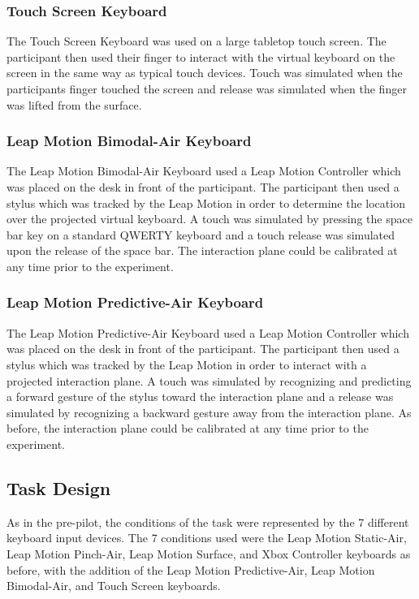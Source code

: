 \subsubsection{Touch Screen Keyboard}
The Touch Screen Keyboard was used on a large tabletop touch screen. The participant then used their finger to interact with the virtual keyboard on the screen in the same way as typical touch devices. Touch was simulated when the participants finger touched the screen and release was simulated when the finger was lifted from the surface.

\subsubsection{Leap Motion Bimodal-Air Keyboard}
The Leap Motion Bimodal-Air Keyboard used a Leap Motion Controller which was placed on the desk in front of the participant. The participant then used a stylus which was tracked by the Leap Motion in order to determine the location over the projected virtual keyboard. A touch was simulated by pressing the space bar key on a standard QWERTY keyboard and a touch release was simulated upon the release of the space bar. The interaction plane could be calibrated at any time prior to the experiment.

\subsubsection{Leap Motion Predictive-Air Keyboard}
The Leap Motion Predictive-Air Keyboard used a Leap Motion Controller which was placed on the desk in front of the participant. The participant then used a stylus which was tracked by the Leap Motion in order to interact with a projected interaction plane. A touch was simulated by recognizing and predicting a forward gesture of the stylus toward the interaction plane and a release was simulated by recognizing a backward gesture away from the interaction plane. As before, the interaction plane could be calibrated at any time prior to the experiment.

\subsection{Task Design} \label{pilot_task_design}
As in the pre-pilot, the conditions of the task were represented by the 7 different keyboard input devices. The 7 conditions used were the Leap Motion Static-Air, Leap Motion Pinch-Air, Leap Motion Surface, and Xbox Controller keyboards as before, with the addition of the Leap Motion Predictive-Air, Leap Motion Bimodal-Air, and Touch Screen keyboards.

